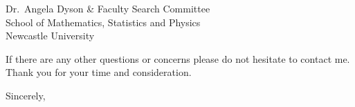 \documentclass[12pt, a4paper]{letter}
\begin{document}
\begin{letter}{
        Dr.~Angela Dyson \& Faculty Search Committee \\
        School of Mathematics, Statistics and Physics \\
        Newcastle University}
    
    If there are any other questions or concerns please do not hesitate to contact me.
    Thank you for your time and consideration.

\closing{Sincerely,}
\vspace{-0.9in}
\\
\end{letter}
\end{document}
